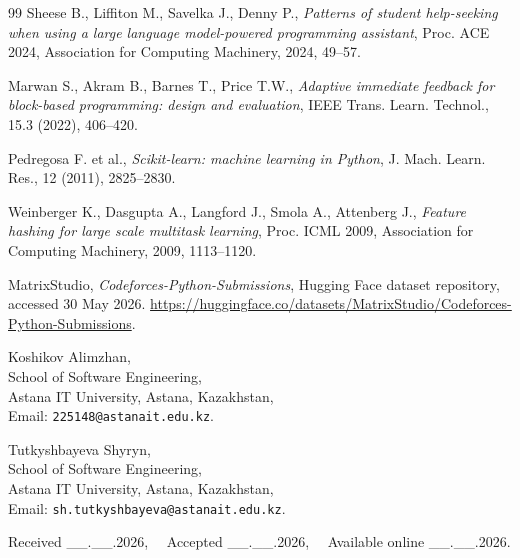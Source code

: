 \documentclass[twoside,11pt]{article}
\begin{document}
\begin{thebibliography}{99}
 Sheese B., Liffiton M., Savelka J., Denny P., {\it Patterns of student help-seeking when using a large language model-powered programming assistant}, Proc. ACE 2024, Association for Computing Machinery, 2024, 49--57.

 Marwan S., Akram B., Barnes T., Price T.W., {\it Adaptive immediate feedback for block-based programming: design and evaluation}, IEEE Trans. Learn. Technol., 15.3 (2022), 406--420.

 Pedregosa F. et al., {\it Scikit-learn: machine learning in Python}, J. Mach. Learn. Res., 12 (2011), 2825--2830.

 Weinberger K., Dasgupta A., Langford J., Smola A., Attenberg J., {\it Feature hashing for large scale multitask learning}, Proc. ICML 2009, Association for Computing Machinery, 2009, 1113--1120.

 MatrixStudio, {\it Codeforces-Python-Submissions}, Hugging Face dataset repository, accessed 30 May 2026. \url{https://huggingface.co/datasets/MatrixStudio/Codeforces-Python-Submissions}.

\end{thebibliography}

\footnotesize
\noindent
\parbox[t]{75mm}{
Koshikov Alimzhan,\\
School of Software Engineering,\\
Astana IT University, Astana, Kazakhstan,\\
Email: {\tt 225148@astanait.edu.kz}.}
\hfill
\parbox[t]{75mm}{
Tutkyshbayeva Shyryn,\\
School of Software Engineering,\\
Astana IT University, Astana, Kazakhstan,\\
Email: {\tt sh.tutkyshbayeva@astanait.edu.kz}.}

\vspace{3mm}
Received \_\_.\_\_.2026, $\> \> \> $ Accepted \_\_.\_\_.2026, $\> \> \> $ Available online \_\_.\_\_.2026.
\end{document}

